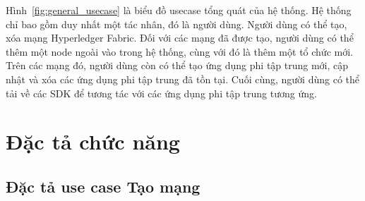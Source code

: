 \documentclass[../DoAn.tex]{subfiles}
\begin{document}
Hình~\ref{fig:general_usecase} là biểu đồ usecase tổng quát của hệ thống. Hệ
thống chỉ bao gồm duy nhất một tác nhân, đó là người dùng. Người dùng có thể
tạo, xóa mạng Hyperledger Fabric. Đối với các mạng đã được tạo, người dùng có
thể thêm một node ngoài vào trong hệ thống, cùng với đó là thêm một tổ chức
mới. Trên các mạng đó, người dùng còn có thể tạo ứng dụng phi tập trung mới,
cập nhật và xóa các ứng dụng phi tập trung đã tồn tại. Cuối cùng, người dùng có
thể tải về các SDK để tương tác với các ứng dụng phi tập trung tương ứng.




\section{Đặc tả chức năng}
\label{section:2.3}

\newpage
\subsection{Đặc tả use case Tạo mạng}
\hfill
\end{document}
